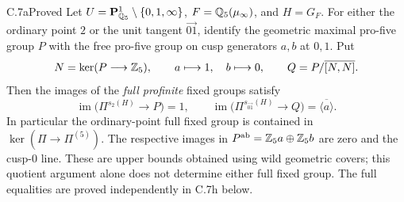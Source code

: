 \begin{claim}{C.7a}{Proved}
Let $U=\mathbf P^1_{\mathbb Q_5}\setminus\{0,1,\infty\}$,
$F=\mathbb Q_5(\mu_\infty)$, and $H=G_F$. For either the ordinary point $2$
or the unit tangent $\overrightarrow{01}$, identify the geometric maximal
pro-five group $P$ with the free pro-five group on cusp generators $a,b$
at $0,1$. Put
\[
 N=\ker(P\longrightarrow\mathbb Z_5),\qquad a\longmapsto1,\quad b\longmapsto0,
 \qquad Q=P/\overline{[N,N]}.
\]
Then the images of the \emph{full profinite} fixed groups satisfy
\[
 \operatorname{im}\bigl(\Pi^{s_2(H)}\to P\bigr)=1,
 \qquad
 \operatorname{im}\bigl(\Pi^{s_{\overrightarrow{01}}(H)}\to Q\bigr)
 =\overline{\langle a\rangle}.
\]
In particular the ordinary-point full fixed group is contained in
$\ker(\Pi\to\Pi^{(5)})$. The respective images in
$P^{\rm ab}=\mathbb Z_5a\oplus\mathbb Z_5b$ are zero and the cusp-$0$ line. These are upper bounds obtained using
wild geometric covers; this quotient argument alone does not determine
either full fixed group. The full equalities are proved independently
in C.7h below.
\end{claim}
